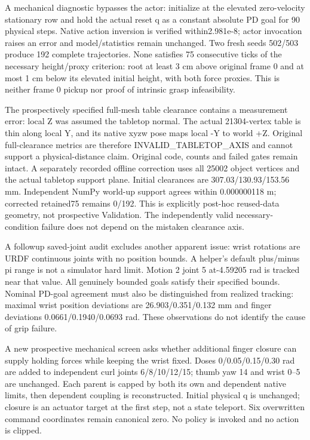 \documentclass[10 pt]{article}
\begin{document}
A mechanical diagnostic bypasses the actor: initialize at the elevated zero-velocity
stationary row and hold the actual reset q as a constant absolute PD goal for 90
physical steps. Native action inversion is verified within2.981e-8; actor invocation
raises an error and model/statistics remain unchanged. Two fresh seeds 502/503 produce
192 complete trajectories. None satisfies 75 consecutive ticks of the necessary
height/proxy criterion: root at least 3 cm above original frame 0 and at most 1 cm below
its elevated initial height, with both force proxies. This is neither frame 0 pickup
nor proof of intrinsic grasp infeasibility.

The prospectively specified full-mesh table clearance contains a measurement error:
local Z was assumed the tabletop normal. The actual 21304-vertex table is thin along
local Y, and its native xyzw pose maps local -Y to world +Z. Original full-clearance
metrics are therefore INVALID\_TABLETOP\_AXIS and cannot support a physical-distance
claim. Original code, counts and failed gates remain intact. A separately recorded
offline correction uses all 25002 object vertices and the actual tabletop support
plane. Initial clearances are 307.03/130.93/153.56 mm. Independent NumPy world-up support
agrees within 0.000000118 m; corrected retained75 remains 0/192. This is explicitly
post-hoc reused-data geometry, not prospective Validation. The independently valid
necessary-condition failure does not depend on the mistaken clearance axis.

A followup saved-joint audit excludes another apparent issue: wrist rotations are
URDF continuous joints with no position bounds. A helper's default plus/minus pi
range is not a simulator hard limit. Motion 2 joint 5 at-4.59205 rad is tracked near
that value. All genuinely bounded goals satisfy their specified bounds. Nominal
PD-goal agreement must also be distinguished from realized tracking: maximal wrist
position deviations are 26.903/0.351/0.132 mm and finger deviations 0.0661/0.1940/0.0693 rad.
These observations do not identify the cause of grip failure.

A new prospective mechanical screen asks whether additional finger closure can
supply holding forces while keeping the wrist fixed. Doses 0/0.05/0.15/0.30 rad are
added to independent curl joints 6/8/10/12/15; thumb yaw 14 and wrist 0--5 are unchanged.
Each parent is capped by both its own and dependent native limits, then dependent
coupling is reconstructed. Initial physical q is unchanged; closure is an actuator
target at the first step, not a state teleport. Six overwritten command coordinates
remain canonical zero. No policy is invoked and no action is clipped.
\end{document}
